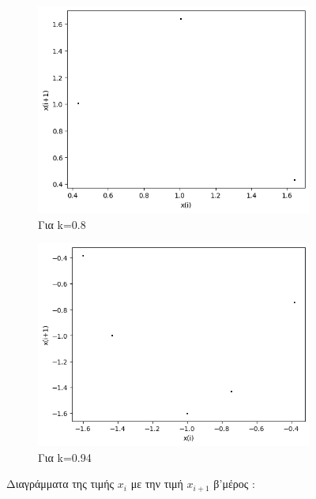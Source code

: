 \begin{figure}[h!]
\begin{subfigure}[b]{0.4\textwidth}
		\includegraphics[width=\textwidth]{LateX images/graphs q16/g19}
		\caption{Για k=0.8}
		\label{f:k90}
	\end{subfigure}
	\hfill
	\begin{subfigure}[b]{0.4\textwidth}
		\centering
		\includegraphics[width=\textwidth]{LateX images/graphs q16/g20}
		\caption{Για k=0.94}
		\label{f:k91}
	\end{subfigure}
	\hfill
	\caption{Διαγράμματα της τιμής \(x_i\) με την τιμή \(x_{i+1}\) β'μέρος :}
	\label{f:k241}
\end{figure}


\clearpage
\newpage

